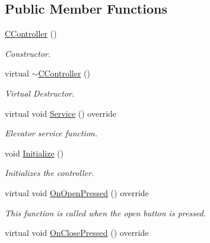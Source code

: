 \subsection*{Public Member Functions}
\begin{DoxyCompactItemize}
\item 
\hypertarget{class_c_controller_a840d9cb376c21b58566c7f9c069e402f}{\hyperlink{class_c_controller_a840d9cb376c21b58566c7f9c069e402f}{C\+Controller} ()}\label{class_c_controller_a840d9cb376c21b58566c7f9c069e402f}

\begin{DoxyCompactList}\small\item\em Constructor. \end{DoxyCompactList}\item 
\hypertarget{class_c_controller_a06c1bf4eeb697d4f7574ea1d7c51d267}{virtual \hyperlink{class_c_controller_a06c1bf4eeb697d4f7574ea1d7c51d267}{$\sim$\+C\+Controller} ()}\label{class_c_controller_a06c1bf4eeb697d4f7574ea1d7c51d267}

\begin{DoxyCompactList}\small\item\em Virtual Destructor. \end{DoxyCompactList}\item 
virtual void \hyperlink{class_c_controller_a6d6c0e9fc0c9d8dac6c16d6c077f0863}{Service} () override
\begin{DoxyCompactList}\small\item\em Elevator service function. \end{DoxyCompactList}\item 
\hypertarget{class_c_controller_a6be672a805c6643891a54711cce3e64d}{void \hyperlink{class_c_controller_a6be672a805c6643891a54711cce3e64d}{Initialize} ()}\label{class_c_controller_a6be672a805c6643891a54711cce3e64d}

\begin{DoxyCompactList}\small\item\em Initializes the controller. \end{DoxyCompactList}\item 
virtual void \hyperlink{class_c_controller_ac0f1d0ba9728974024a921cd2e372fc2}{On\+Open\+Pressed} () override
\begin{DoxyCompactList}\small\item\em This function is called when the open button is pressed. \end{DoxyCompactList}\item 
\hypertarget{class_c_controller_a4572ee70739d93ebf98db14ee85812b1}{virtual void \hyperlink{class_c_controller_a4572ee70739d93ebf98db14ee85812b1}{On\+Close\+Pressed} () override}\label{class_c_controller_a4572ee70739d93ebf98db14ee85812b1}


\end{DoxyCompactItemize}
